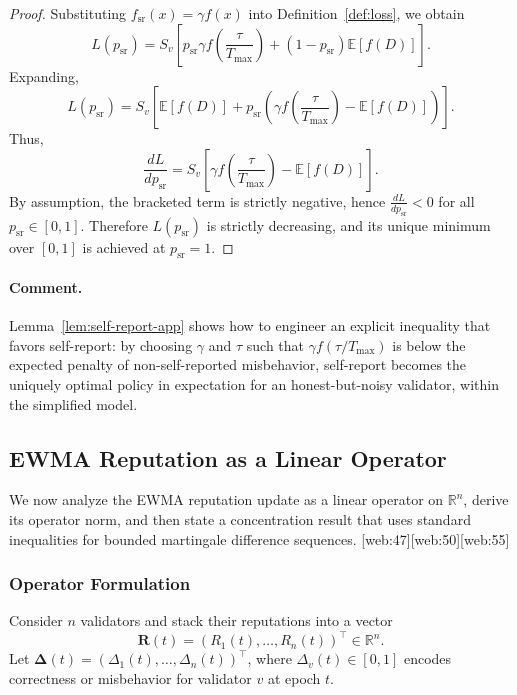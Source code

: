 \documentclass[11pt]{article}
\theoremstyle{plain}
\theoremstyle{definition}
\begin{document}
\begin{proof}
Substituting \(f_{\mathrm{sr}}(x)=\gamma f(x)\) into Definition~\ref{def:loss}, we obtain
\[
L(p_{\mathrm{sr}})
= S_v\left[p_{\mathrm{sr}} \gamma f\!\left(\frac{\tau}{T_{\max}}\right)
+ (1-p_{\mathrm{sr}})\mathbb{E}[f(D)]\right].
\]
Expanding,
\[
L(p_{\mathrm{sr}})
= S_v\left[
\mathbb{E}[f(D)] + p_{\mathrm{sr}}\left(\gamma f\!\left(\frac{\tau}{T_{\max}}\right) - \mathbb{E}[f(D)]\right)
\right].
\]
Thus,
\[
\frac{dL}{dp_{\mathrm{sr}}}
= S_v\left[\gamma f\!\left(\frac{\tau}{T_{\max}}\right) - \mathbb{E}[f(D)]\right].
\]
By assumption, the bracketed term is strictly negative, hence \(\frac{dL}{dp_{\mathrm{sr}}} < 0\) for all \(p_{\mathrm{sr}}\in[0,1]\). Therefore \(L(p_{\mathrm{sr}})\) is strictly decreasing, and its unique minimum over \([0,1]\) is achieved at \(p_{\mathrm{sr}} = 1\).
\end{proof}

\paragraph{Comment.}
Lemma~\ref{lem:self-report-app} shows how to engineer an explicit inequality that favors self-report: by choosing \(\gamma\) and \(\tau\) such that \(\gamma f(\tau/T_{\max})\) is below the expected penalty of non-self-reported misbehavior, self-report becomes the uniquely optimal policy in expectation for an honest-but-noisy validator, within the simplified model.

\subsection{EWMA Reputation as a Linear Operator}

We now analyze the EWMA reputation update as a linear operator on \(\mathbb{R}^n\), derive its operator norm, and then state a concentration result that uses standard inequalities for bounded martingale difference sequences. [web:47][web:50][web:55]

\subsubsection{Operator Formulation}

Consider \(n\) validators and stack their reputations into a vector
\[
\bm{R}(t) = (R_1(t),\dots,R_n(t))^\top \in \mathbb{R}^n.
\]
Let \(\bm{\Delta}(t) = (\Delta_1(t),\dots,\Delta_n(t))^\top\), where \(\Delta_v(t) \in [0,1]\) encodes correctness or misbehavior for validator \(v\) at epoch \(t\).
\end{document}
